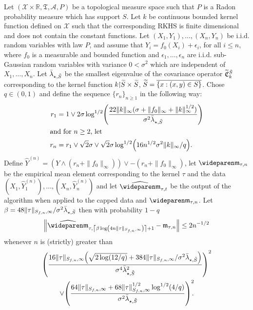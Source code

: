 \documentclass[AHL,Unicode,longabstracts,published]{cedram}
\theoremstyle{remark}
\newcommand{\restrr}
{\!\!\upharpoonright\!\!}
\newcommand{\R}{\mathbb{R}}
\newcommand{\X}{\mathcal{X}}
\newcommand{\clA}{\mathcal{A}}
\newcommand{\fkC}{\mathfrak{C}}
\newcommand{\fkT}{\mathfrak{T}}
\newcommand{\Cov}{\tilde{\fkC}}
\newcommand{\mean}{\mathfrak{m}}
\newcommand{\wh}{\widehat}
\let\oldtilde\tilde
\renewcommand*{\tilde}[1]{\mathchoice{\widetilde{#1}}{\widetilde{#1}}{\oldtilde{#1}}{\oldtilde{#1}}}
\let\originalleft\left
\let\originalright\right
\renewcommand{\left}{\mathopen{}\mathclose\bgroup\originalleft}
\renewcommand{\right}{\aftergroup\egroup\originalright}
\begin{document}
\begin{prop}\label{prop4.3}
Let $(\X \times \R, \fkT, \clA,P)$ be a topological measure space such that $P$ is a Radon probability measure which has support $S$. Let $k$ be continuous bounded kernel function defined on $\X$ such that the corresponding RKHS is finite dimensional and does not contain the constant functions. Let $(X_1,Y_1), \dots, (X_n,Y_n)$ be i.i.d. random variables with law $P$, and assume that $Y_i = f_0(X_i) + \epsilon_i$, for all $i \leq n$, where $f_0$ is a measurable and bounded function and $\epsilon_1,\dots, \epsilon_n$ are i.i.d. sub-Gaussian random variables with variance $0 < \sigma^2$ which are independent of $X_1,\dots, X_n$. Let $\bar \lambda_{\star,\tilde S}$ be the smallest eigenvalue of the covariance operator $\Cov^{\tilde S}_k$ corresponding to the kernel function $k\restrr \tilde S \times \tilde S$, $\tilde S = \overline{\{x: (x,y) \in S\}}$. Chose $q \in (0,1)$ and define the sequence $\{r_n\}_{n\geq 1}$ in the following way:
\begin{align*}
r_1 &= 1 \vee 2 \sigma \log^{1/2}\left(\frac{22 \|k\|_\infty (\sigma + \|f_0\|_\infty + \|k\|_\infty^{1/2}) }{\sigma^2 \bar \lambda_{\star,\tilde S}}
\right)
\\
\intertext{and for $n\geq 2$, let}
r_n &= r_1 \vee\sqrt{2} \sigma \vee \sqrt{2} \sigma \log^{1/2}\left(16 n^{1/2} \sigma^2 \|k\|_\infty/ q\right).
\end{align*}
Define $\wideparen Y^{(n)} = (Y \wedge (r_n + \|f_0\|_\infty)) \vee - (r_n + \|f_0\|_\infty)$, let $\wideparen \mean_{\tau,n}$ be the empirical mean element corresponding to the kernel $\tau$ and the data $(X_1, \wideparen Y_1^{(n)}), \dots, (X_n, \wideparen Y_n^{(n)})$ and let $\wh{\wideparen \mean}_{\tau,t}$ be the output of the algorithm when applied to the capped data and $\wideparen \mean_{\tau,n}$. Let $\beta = 48 \|\tau \|_{S_{f,n},\infty} /\sigma^2 \bar \lambda_{\star,\tilde S}$ then with probability $1-q$
\[
\left\| \wh{\wideparen \mean}_{\tau,\left\lceil \beta \log\left(4 n \|\tau \|_{S_{f,n},\infty}\right) \right\rceil +1} - \mean_{\tau,n} \right\| \leq 2 n^{-1/2}
\]
whenever $n$ is (strictly) greater than
\begin{multline*}
\left(
\frac{16 \|\tau\|_{S_{f,n},\infty} \left(\sqrt{2\log(12/q)} + 384 \|\tau\|_{S_{f,n},\infty} /\sigma^2 \bar \lambda_{\star,\tilde S}\right)}{
\sigma^4 \bar \lambda^2_{\star, \tilde S}} \right)^2 \\
\vee \left(\frac{64\|\tau\|_{S_{f,n},\infty} + 68 \|\tau\|_{S_{f,n},\infty}^{1/2} \log^{1/2}(4/q)}{\sigma^2 \bar \lambda_{\star,\tilde S}}\right)^{2}\!\!.
\end{multline*}
\end{prop}
\end{document}
